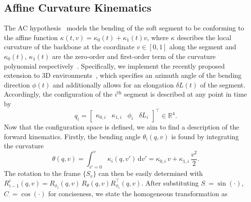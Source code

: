 \subsection{Affine Curvature Kinematics}\label{sub:promasens:kinematic_model_ac}
The \gls{AC} hypothesis~\citep{della2020soft, stella2023piecewise} models the bending of the soft segment to be conforming to the affine function $\kappa(t,v) = \kappa_0(t) + \kappa_1(t) v$, where $\kappa$ describes the local curvature of the backbone at the coordinate $v \in [0, 1]$ along the segment and $\kappa_0(t)$, $\kappa_1(t)$ are the zero-order and first-order term of the curvature polynomial respectively~\citep{della2019control}.
Specifically, we implement the recently proposed extension to 3D environments~\citep{stella2023piecewise}, which specifies an azimuth angle of the bending direction $\phi(t)$ and additionally allows for an elongation $\delta L(t)$ of the segment.
Accordingly, the configuration of the $i^\mathrm{th}$ segment is described at any point in time by
\begin{equation}
    q_i = \begin{bmatrix}\kappa_{0,i} & \kappa_{1,i} & \phi_i & \delta L_{i} \end{bmatrix}^{\top} \in \mathbb{R}^4.
\end{equation}
Now that the configuration space is defined, we aim to find a description of the forward kinematics. Firstly, the bending angle $\theta_i(q, v)$ is found by integrating the curvature
\begin{equation}
    \theta(q,v) = \int_{v'=0}^{v} \kappa_i(q, v') \, \mathrm{d}v' = \kappa_{0,i} \, v + \kappa_{1,i} \, \frac{v^2}{2}.
\end{equation}
The rotation to the frame $\{S_{v}\}$ can then be easily determined with $R_{i-1}^{i}(q,v) = R_{\phi_i}(q,v) \, R_{\theta}(q,v) R_{\phi_i}^\top(q,v)$. After substituting $S_{\cdot} = \sin(\cdot)$, $C_{\cdot} = \cos(\cdot)$ for conciseness, we state the homogeneous transformation as
